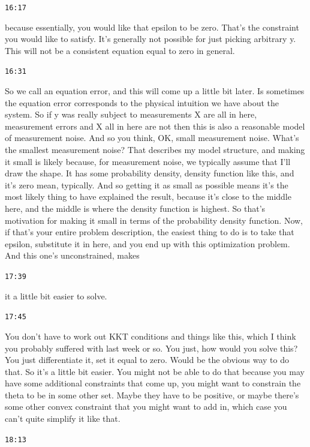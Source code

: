\documentclass[11pt,a4paper]{article}
\newcommand{\timestamp}[1]{%
  \par\vspace{0.35em}%
  \noindent\colorbox{timestampback}{\textcolor{timestampblue}{\small\texttt{#1}}}%
  \par\vspace{0.2em}%
}
\begin{document}
\timestamp{16:17}

because essentially, you would like that epsilon to be zero. That's the constraint you would like to satisfy. It's generally not possible for just picking arbitrary y. This will not be a consistent equation equal to zero in general.



\timestamp{16:31}

So we call an equation error, and this will come up a little bit later. Is sometimes the equation error corresponds to the physical intuition we have about the system. So if y was really subject to measurements X are all in here, measurement errors and X all in here are not then this is also a reasonable model of measurement noise. And so you think, OK, small measurement noise. What's the smallest measurement noise? That describes my model structure, and making it small is likely because, for measurement noise, we typically assume that I'll draw the shape. It has some probability density, density function like this, and it's zero mean, typically. And so getting it as small as possible means it's the most likely thing to have explained the result, because it's close to the middle here, and the middle is where the density function is highest. So that's motivation for making it small in terms of the probability density function. Now, if that's your entire problem description, the easiest thing to do is to take that epsilon, substitute it in here, and you end up with this optimization problem. And this one's unconstrained, makes



\timestamp{17:39}

it a little bit easier to solve.



\timestamp{17:45}

You don't have to work out KKT conditions and things like this, which I think you probably suffered with last week or so. You just, how would you solve this? You just differentiate it, set it equal to zero. Would be the obvious way to do that. So it's a little bit easier. You might not be able to do that because you may have some additional constraints that come up, you might want to constrain the theta to be in some other set. Maybe they have to be positive, or maybe there's some other convex constraint that you might want to add in, which case you can't quite simplify it like that.



\timestamp{18:13}
\end{document}
